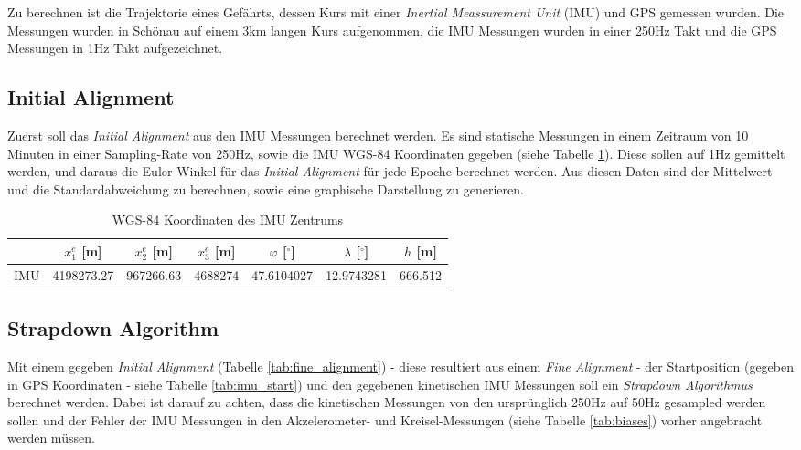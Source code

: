 
Zu berechnen ist die Trajektorie eines Gefährts, dessen Kurs mit einer \textit{Inertial Meassurement Unit} (IMU) und GPS gemessen wurden. Die Messungen wurden in Schönau auf einem 3\;km langen Kurs aufgenommen, die IMU Messungen wurden in einer 250\;Hz Takt und die GPS Messungen in 1\;Hz Takt aufgezeichnet.

\subsection{Initial Alignment}

Zuerst soll das \textit{Initial Alignment} aus den IMU Messungen berechnet werden. Es sind statische Messungen in einem Zeitraum von 10 Minuten in einer Sampling-Rate von 250\;Hz, sowie die IMU WGS-84 Koordinaten gegeben (siehe Tabelle \ref{tab:imu_centre}). Diese sollen auf 1\;Hz gemittelt werden, und daraus die Euler Winkel für das \textit{Initial Alignment} für jede Epoche berechnet werden. Aus diesen Daten sind der Mittelwert und die Standardabweichung zu berechnen, sowie eine graphische Darstellung zu generieren.

\begin{table}[htbp]
	\centering
	\caption{WGS-84 Koordinaten des IMU Zentrums}
	\label{tab:imu_centre}
		\begin{tabular}{ lcccccc }
		\addlinespace[10pt]
		   	& $x_1^e$ [m] 	& $x_2^e$ [m] 	& $x_3^e$ [m] 	& $\varphi$ [$^\circ$] 	& $\lambda$ [$^\circ$] 	& $h$ [m]\\ \toprule
		IMU 	& 4198273.27 	& 967266.63 	&  4688274 	& 47.6104027			& 12.9743281			& 666.512 \\ \bottomrule
		\end{tabular}
\end{table}

\subsection{Strapdown Algorithm}

Mit einem gegeben \textit{Initial Alignment} (Tabelle \ref{tab:fine_alignment}) - diese resultiert aus einem \textit{Fine Alignment} - der Startposition (gegeben in GPS Koordinaten - siehe Tabelle \ref{tab:imu_start}) und den gegebenen kinetischen IMU Messungen soll ein \textit{Strapdown Algorithmus} berechnet werden. Dabei ist darauf zu achten, dass die kinetischen Messungen von den ursprünglich 250\;Hz auf 50\;Hz gesampled werden sollen und der Fehler der IMU Messungen in den Akzelerometer- und Kreisel-Messungen (siehe Tabelle \ref{tab:biases}) vorher angebracht werden müssen.

